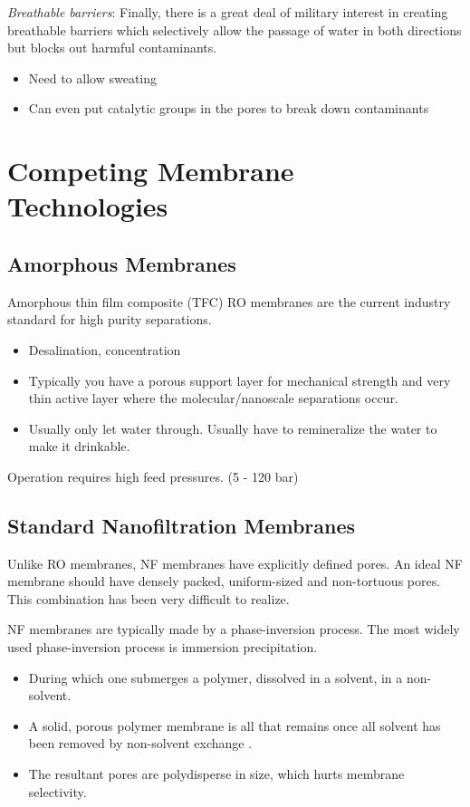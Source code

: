   \textit{Breathable barriers}:
  Finally, there is a great deal of military interest in creating breathable 
  barriers which selectively allow the passage of water in both directions but
  blocks out harmful contaminants.
  \begin{itemize}
    \item Need to allow sweating
    \item Can even put catalytic groups in the pores to break down contaminants
  \end{itemize}

  \section{Competing Membrane Technologies}

  \subsection{Amorphous Membranes}
  
  Amorphous thin film composite (TFC) RO membranes are the current industry standard for
  high purity separations.
  \begin{itemize}  
    \item Desalination, concentration
    \item Typically you have a porous support layer for mechanical strength and 
    very thin active layer where the 
molecular/nanoscale
separations occur.
    \item Usually only let water through. Usually have to remineralize the
    water to make it drinkable.
  \end{itemize}
  
  Operation requires high feed pressures. (5 - 120 bar) ~\cite{van_der_bruggen_review_2003}
  
  \subsection{Standard Nanofiltration Membranes}
  Unlike RO membranes, NF membranes have explicitly defined pores. An
  ideal NF membrane should have densely packed, uniform-sized and
  non-tortuous pores. This combination has been very difficult to realize.
  
  NF membranes are typically made by a phase-inversion process. The most 
  widely used phase-inversion process is immersion precipitation.
  \begin{itemize}
    \item During which one submerges a polymer, dissolved in a solvent, in
    a non-solvent.
    \item A solid, porous polymer membrane is all that remains once all
    solvent has been removed by non-solvent exchange \cite{smolders_microstructures_1992}.
    \item The resultant pores are polydisperse in size, which hurts membrane selectivity. 
  \end{itemize}    
    
